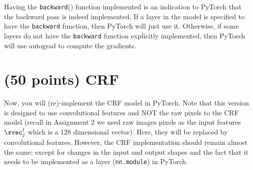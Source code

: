 \documentclass[11pt]{report}
\begin{document}
\begin{itemize}

Having the \verb#backward#() function implemented is an indication to PyTorch that the backward pass is indeed implemented. If a layer in the model is specified to have the \verb#backward# function, then PyTorch will just use it.
Otherwise, if some layers do not have the \verb#backward# function explicitly implemented,
then PyTorch will use autograd to compute the gradients.

\end{itemize}

\section{(50 points) CRF}

Now, you will (re)-implement the CRF model in PyTorch. Note that this version is
designed to use convolutional features and NOT the raw pixels to the CRF model
(recall in Assignment 2 we used raw images pixels as the input features
$\xvec^{t}_{j}$ which is a 128 dimensional vector). Here, they will be replaced
by convolutional features. However, the CRF implementation should remain almost
the same; except for changes in the input and output shapes and the fact that it
needs to be implemented as a layer (\texttt{nn.module}) in PyTorch.
\end{document}
